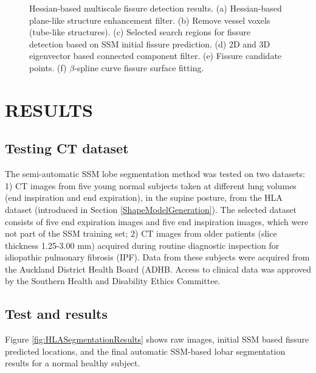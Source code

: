 \documentclass[]{spie}  %
\begin{document}
{\begin{figure}[htbp]
\begin{subfigure}
{\begin{minipage}[t]{0.305\linewidth}
  \centerline{}
	\label{fig:FissureDetection-f}
	\end{minipage}%
   }%
\end{subfigure}
\caption{Hessian-based multiscale fissure detection results. (a) Hessian-based plane-like structure enhancement filter. (b) Remove vessel voxels (tube-like structures). (c) Selected search regions for fissure detection based on SSM initial fissure prediction. (d) 2D and 3D eigenvector based connected component filter. (e) Fissure candidate points. (f) $\beta$-spline curve fissure surface fitting.}
\label{fig:FissureDetection}
\end{figure}

\section{RESULTS}
\label{SegmentationExperiment}
 
\subsection{Testing CT dataset}

The semi-automatic SSM lobe segmentation method was tested on two datasets: 1) CT images from five young normal subjects taken at different lung volumes (end inspiration and end expiration), in the supine posture, from the HLA dataset (introduced in Section \ref{ShapeModelGeneration}). The selected dataset consists of five end expiration images and five end inspiration images, which were not part of the SSM training set; 2) CT images from older patients (slice thickness 1.25-3.00 mm) acquired during routine diagnostic inspection for idiopathic pulmonary fibrosis (IPF). Data from these subjects were acquired from the Auckland District Health Board (ADHB. Access to clinical data was approved by the Southern Health and Disability Ethics Committee. 

\subsection{Test and results}
Figure \ref{fig:HLASegmentationResults} shows raw images, initial SSM based fissure predicted locations, and the final automatic SSM-based lobar segmentation results for a normal healthy subject.  

}
\end{document}

